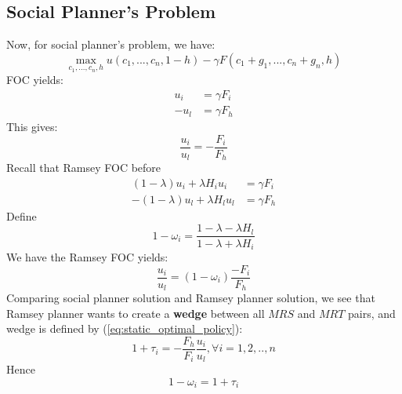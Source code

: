 \documentclass[12pt]{article}
\begin{document}
	\subsection{Social Planner's Problem}
	Now, for social planner's problem, we have:
	\begin{equation}
		\max_{c_1, ..., c_n, h} u(c_1, ..., c_n, 1-h) - \gamma F(c_1 + g_1 , ..., c_n + g_n, h)
	\end{equation}
	FOC yields:
	\begin{align*}
		u_i &= \gamma F_i\\
		-u_l &= \gamma F_h
	\end{align*}
	This gives:
	\begin{equation}
		\frac{u_i}{u_l} = -\frac{F_i}{F_h}
	\end{equation}
	Recall that Ramsey FOC before
	\begin{align*}
		(1-\lambda) u_i + \lambda H_i u_i &= \gamma F_i\\
		-(1-\lambda) u_l + \lambda H_l u_l &= \gamma F_h
	\end{align*}
	Define
	\begin{equation}
		1 - \omega_i = \frac{1 - \lambda -\lambda H_l}{1 - \lambda + \lambda H_i}
	\end{equation}
	We have the Ramsey FOC yields:
	\begin{equation}
		\frac{u_i}{u_l} =  (1-\omega_i)\frac{-F_i}{F_h}
	\end{equation}
	Comparing social planner solution and Ramsey planner solution, we see that Ramsey planner wants to create a \textbf{wedge} between all $MRS$ and $MRT$ pairs, and wedge is defined by (\ref{eq:static_optimal_policy}):
	\begin{equation*}
		1 + \tau_i = -\frac{F_h}{F_i}\frac{u_i}{u_l}, \forall i = 1, 2, .., n
	\end{equation*}
Hence
	\begin{equation}
		1-\omega_i = 1 + \tau_i
	\end{equation}
	
\end{document}
